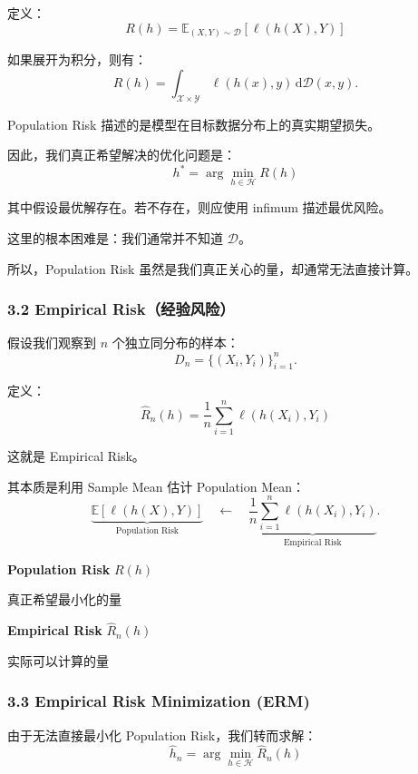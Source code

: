 定义：
\[\boxed{
R(h)=
\mathbb E_{(X,Y)\sim\mathcal D}
[\ell(h(X),Y)]
}\]

如果展开为积分，则有：
\[R(h)=
\int_{\mathcal X\times\mathcal Y}
\ell(h(x),y)\,\mathrm d\mathcal D(x,y).\]

Population Risk 描述的是模型在目标数据分布上的真实期望损失。

因此，我们真正希望解决的优化问题是：
\[\boxed{
h^*=\arg\min_{h\in\mathcal H}R(h)
}\]

其中假设最优解存在。若不存在，则应使用 infimum 描述最优风险。

这里的根本困难是：我们通常并不知道 \(\mathcal D\)。

所以，Population Risk 虽然是我们真正关心的量，却通常无法直接计算。

\hypertarget{part-2-12-0001-empirical-riskux7ecfux9a8cux98ceux9669}{%
\subsubsection{3.2 Empirical Risk（经验风险）}\label{part-2-12-0001-empirical-riskux7ecfux9a8cux98ceux9669}}

假设我们观察到 \(n\) 个独立同分布的样本：
\[D_n=\{(X_i,Y_i)\}_{i=1}^{n}.\]

定义：
\[\boxed{
\widehat R_n(h)
=
\frac1n
\sum_{i=1}^{n}
\ell(h(X_i),Y_i)
}\]

这就是 Empirical Risk。

其本质是利用 Sample Mean 估计 Population Mean：
\[\underbrace{
\mathbb E[\ell(h(X),Y)]
}_{\text{Population Risk}}
\quad\longleftarrow\quad
\underbrace{
\frac1n\sum_{i=1}^{n}\ell(h(X_i),Y_i)
}_{\text{Empirical Risk}}.\]


\textbf{Population Risk} \(R(h)\)

真正希望最小化的量

\textbf{Empirical Risk} \(\widehat R_n(h)\)

实际可以计算的量

\hypertarget{part-2-12-0001-empirical-risk-minimization-erm}{%
\subsubsection{3.3 Empirical Risk Minimization (ERM)}\label{part-2-12-0001-empirical-risk-minimization-erm}}

由于无法直接最小化 Population Risk，我们转而求解：
\[\boxed{
\hat h_n
=
\arg\min_{h\in\mathcal H}
\widehat R_n(h)
}\]

